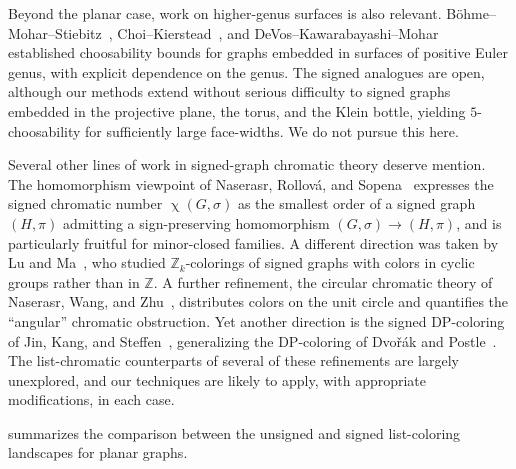 \documentclass[11pt,a4paper]{article}
\theoremstyle{plain}
\theoremstyle{definition}
\newcommand{\Z}{\mathbb{Z}}
\DeclareMathOperator{\chia}{\chi}
\newcommand{\Gs}{(G,\sigma)}
\begin{document}
Beyond the planar case, work on higher-genus surfaces is also
relevant. B\"ohme--Mohar--Stiebitz~\cite{BohmeMS1999},
Choi--Kierstead~\cite{ChoiKierstead2019}, and
DeVos--Kawarabayashi--Mohar~\cite{DeVosKawarabayashiMohar2008}
established choosability bounds for graphs embedded in surfaces of
positive Euler genus, with explicit dependence on the genus. The
signed analogues are open, although our methods extend without
serious difficulty to signed graphs embedded in the projective
plane, the torus, and the Klein bottle, yielding $5$-choosability
for sufficiently large face-widths. We do not pursue this here.

Several other lines of work in signed-graph chromatic theory
deserve mention. The homomorphism viewpoint of Naserasr, Rollov\'a,
and Sopena~\cite{NaserasrRS2015} expresses the signed chromatic
number $\chia\Gs$ as the smallest order of a signed graph $(H,\pi)$
admitting a sign-preserving homomorphism $\Gs\to(H,\pi)$, and is
particularly fruitful for minor-closed families. A different
direction was taken by Lu and Ma~\cite{LuMa2019}, who studied
$\Z_k$-colorings of signed graphs with colors in cyclic groups
rather than in $\Z$. A further refinement, the circular chromatic
theory of Naserasr, Wang, and Zhu~\cite{NaserasrWangZhu2021},
distributes colors on the unit circle and quantifies the
``angular'' chromatic obstruction. Yet another direction is the
signed DP-coloring of Jin, Kang, and
Steffen~\cite{JinKangSteffen2018}, generalizing the DP-coloring of
Dvo\v{r}\'ak and Postle~\cite{DvorakPostle2018}. The list-chromatic
counterparts of several of these refinements are largely
unexplored, and our techniques are likely to apply, with
appropriate modifications, in each case.

 summarizes the comparison between the unsigned and
signed list-coloring landscapes for planar graphs.
\end{document}
